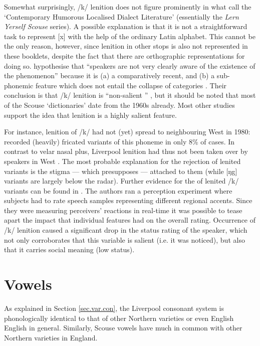 Somewhat surprisingly, /k/ lenition does not figure prominently in what \textcite{honeybonewatson2013} call the `Contemporary Humorous Localised Dialect Literature' (essentially the \emph{Lern Yerself Scouse} series).
A possible explanation is that it is not a straightforward task to represent [x] with the help of the ordinary Latin alphabet.
This cannot be the only reason, however, since lenition in other stops is also not represented in these booklets, despite the fact that there are orthographic representations for doing so.
\textcite{honeybonewatson2013} hypothesise that ``speakers are not very clearly aware  of the existence of the phenomenon'' because it is (a) a comparatively recent, and (b) a sub-phonemic feature which does not entail the collapse of categories \parencite[cf.][329--331]{honeybonewatson2013}.
Their conclusion is that /k/ lenition is ``non-salient '' \parencite[333]{honeybonewatson2013}, but it should be noted that most of the Scouse `dictionaries' date from the 1960s already.
Most other studies support the idea that lenition is a highly salient  feature.

For instance, lenition of /k/ had not (yet) spread to neighbouring West  in 1980: \textcite[97]{newbrook1999} recorded (heavily) fricated variants of this phoneme in only 8\% of cases.
In contrast to velar nasal plus, Liverpool lenition had thus not been taken over by speakers in West .
The most probable explanation for the rejection of lenited variants is the stigma --- which presupposes  --- attached to them (while [ŋg] variants are largely below the radar).
Further evidence for the  of lenited /k/ variants can be found in \citealt{watsonclark2015}.
The authors ran a perception experiment where subjects had to rate speech samples representing different regional accents.
Since they were measuring perceivers' reactions in real-time it was possible to tease apart the impact that individual features had on the overall rating.
Occurrence of /k/ lenition caused a significant drop in the status rating of the speaker, which not only corroborates that this variable is salient  (i.e. it was noticed), but also that it carries social meaning (low status).

	\section{Vowels}\label{sec.var.vow}

As explained in Section \ref{sec.var.con}, the Liverpool consonant system is phonologically identical to that of other Northern varieties or even English English in general.
Similarly, Scouse vowels have much in common with other Northern varieties in England.

